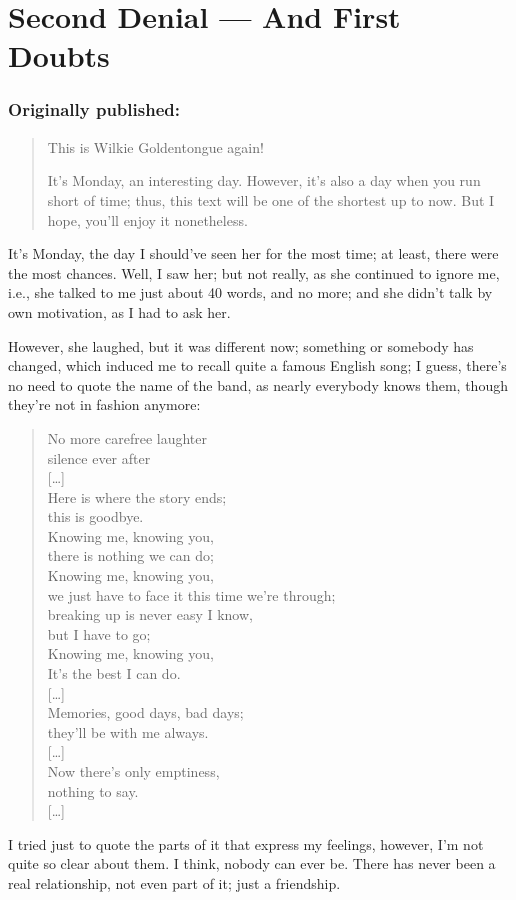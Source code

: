 \chapter{Second Denial --- And First Doubts}
\label{cha:second-denial-first-doubts}
\subsection*{Originally published: }
\begin{quote}
This is Wilkie Goldentongue again!

It's Monday, an interesting day. However, it's also a day when you run short of time; thus, this text will be one of the shortest up to now. But I hope, you'll enjoy it nonetheless. 
\end{quote}

It's Monday, the day I should've seen her for the most time; at least, there were the most chances. Well, I saw her; but not really, as she continued to ignore me, i.e., she talked to me just about 40 words, and no more; and she didn't talk by own motivation, as I had to ask her.

However, she laughed, but it was different now; something or somebody has changed, which induced me to recall quite a famous English song; I guess, there's no need to quote the name of the band, as nearly everybody knows them, though they're not in fashion anymore:
\begin{quote}
No more carefree laughter\\
silence ever after\\
{[\dots{}]}\\
Here is where the story ends;\\
this is goodbye.\\
Knowing me, knowing you,\\
there is nothing we can do; \\
Knowing me, knowing you, \\
we just have to face it this time we're through;\\
breaking up is never easy I know,\\
but I have to go;\\
Knowing me, knowing you,\\
It's the best I can do. \\
{[\dots{}]}\\
Memories, good days, bad days;\\
they'll be with me always. \\
{[\dots{}]}\\
Now there's only emptiness,\\
nothing to say.\\
{[\dots{}]}
\end{quote}
I tried just to quote the parts of it that express my feelings, however, I'm not quite so clear about them. I think, nobody can ever be. There has never been a real relationship, not even part of it; just a friendship.

